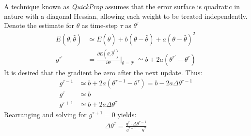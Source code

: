\documentclass[a4paper]{book}
\newcommand{\ix}[1]{%
  \leavevmode %
  \marginpar{\small\emph{#1}}%
}
\begin{document}
A\ix{QuickProp} technique known as \emph{QuickProp} assumes that the error surface is quadratic in nature with a diagonal Hessian, allowing each weight to be treated independently. Denote the estimate for $\theta$ as time-step $\tau$ as $\theta^{\tau}$
\begin{align}
E(\theta, \hat{\theta}) &\simeq E(\hat{\theta}) + b(\theta - \hat{\theta}) + a(\theta - \hat{\theta})^2 \\
g^{\tau'}&= \frac{\partial E(\theta, \hat{\theta}^{\tau})}{\partial \theta} \Big |_{\theta = \theta^{\tau'}} \simeq b + 2a(\theta^{\tau'} - \theta^{\tau} )
\end{align}
It is desired that the gradient be zero after the next update. Thus:
\begin{align}
g^{\tau - 1} &\simeq b + 2a(\theta^{\tau - 1} - \theta^\tau) = b - 2a \Delta \theta^{\tau - 1} \\
g^{\tau} &\simeq b \\
g^{\tau + 1} &\simeq b + 2a \Delta \theta^{\tau}
\end{align}
Rearranging and solving for $g^{\tau + 1} = 0$ yields:
\begin{align}
\Delta \theta^{\tau} = \frac{g^{\tau} \cdot \Delta \theta^{\tau-1}}{g^{\tau - 1} - g^{\tau}}
\end{align}
\end{document}
